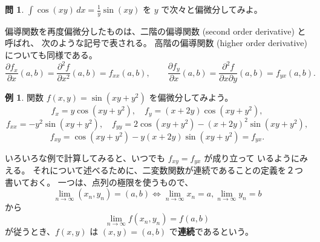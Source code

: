 \documentclass[a4paper]{jsarticle}
\theoremstyle{definition}
\newtheorem{Example}[Theorem]{例}
\newtheorem{Exercise}{問}%
\theoremstyle{remark}
\newcommand{\del}{\partial}
\newcommand{\R}{\text{\ym R}}
\begin{document}
\begin{Exercise}
$\displaystyle \int \cos(xy)\,dx = \frac{1}{y} \sin(xy)$ を $y$ で次々と偏微分してみよ。
\end{Exercise}

偏導関数を再度偏微分したものは、二階の偏導関数 (second order derivative) と呼ばれ、
次のような記号で表される。
高階の偏導関数 (higher order derivative) についても同様である。
\[
\frac{\partial f_x}{\partial x}(a,b) = \frac{\partial^2f}{\partial x^2}(a,b) 
= f_{xx}(a,b), 
\qquad 
\frac{\partial f_y}{\partial x}(a,b) = \frac{\partial^2f}{\partial x\partial y}(a,b) 
= f_{yx}(a,b). 
\]




\begin{Example}
関数 $f(x,y) = \sin(xy + y^2)$ を偏微分してみよう。
\[
f_x = y\cos(xy + y^2),
\quad
f_y = (x+2y)\cos(xy+y^2),
\]
\[
f_{xx} = -y^2\sin(xy+y^2),
\quad
f_{yy} = 2\cos(xy+y^2) - (x+2y)^2\sin(xy+y^2),
\]
\[
f_{xy} = \cos(xy+y^2) -y(x+2y)\sin(xy+y^2) 
= f_{yx}.
\]
\end{Example}

いろいろな例で計算してみると、いつでも $f_{xy} = f_{yx}$ が成り立って
いるようにみえる。%
それについて述べるために、二変数関数が連続であることの定義を２つ書いておく。
一つは、点列の極限を使うもので、
\[
\lim_{n \to \infty} (x_n,y_n) = (a,b) 
\iff 
\lim_{n \to \infty} x_n = a, 
\lim_{n \to \infty} y_n = b 
\]
から
\[
\lim_{n \to \infty} f(x_n,y_n) = f(a,b)
\]
が従うとき、$f(x,y)$ は $(x,y) = (a,b)$ で\textbf{連続}であるという。
\end{document}
